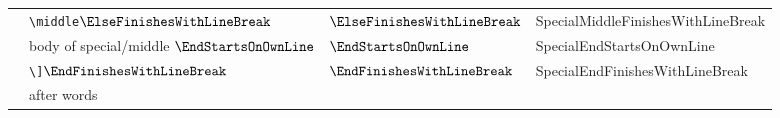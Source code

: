 \begin{longtable}{llll}
		                                       & \verb!\middle!$\ElseFinishesWithLineBreak$ & $\ElseFinishesWithLineBreak$            & SpecialMiddleFinishesWithLineBreak                                \\
		                                       & body of special/middle $\EndStartsOnOwnLine$            & $\EndStartsOnOwnLine$                   & SpecialEndStartsOnOwnLine                                         \\
		                                       & \verb!\]!$\EndFinishesWithLineBreak$  & $\EndFinishesWithLineBreak$             & SpecialEndFinishesWithLineBreak                                   \\
		                                       & after words                                             &                                         &                                                                   \\
		\bottomrule
	\end{longtable}
